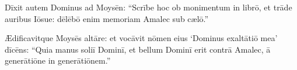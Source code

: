 Dīxit autem
Dominus ad Moysēn: ``Scrībe hoc ob monimentum in librō, et trāde auribus Iōsue: dēlēbō enim memoriam
Amalec sub cælō.'' 

Ædificavitque Moysēs altāre: et vocāvit nōmen eius
`Dominus exaltātiō mea' dīcēns: 
``Quia manus soliī Dominī,
et bellum Dominī erit contrā Amalec, ā generātiōne in generātiōnem.''
